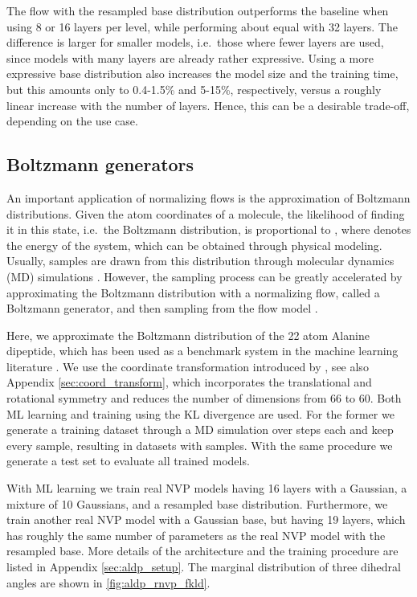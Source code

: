 \documentclass[twoside]{article}
\begin{document}
The flow with the resampled base distribution outperforms the baseline when using 8 or 16 layers per level, while performing about equal with 32 layers. The difference is larger for smaller models, i.e.\ those where fewer layers are used, since models with many layers are already rather expressive. Using a more expressive base distribution also increases the model size and the training time, but this amounts only to 0.4-1.5\% and 5-15\%, respectively, versus a roughly linear increase with the number of layers. Hence, this can be a desirable trade-off, depending on the use case.



\subsection{Boltzmann generators}
\label{sec:boltz_gen}

An important application of normalizing flows is the approximation of Boltzmann distributions. Given the atom coordinates  of a molecule, the likelihood of finding it in this state, i.e.\ the Boltzmann distribution, is proportional to , where  denotes the energy of the system, which can be obtained through physical modeling. Usually, samples are drawn from this distribution through molecular dynamics (MD) simulations \citep{Leimkuhler2015}. However, the sampling process can be greatly accelerated by approximating the Boltzmann distribution with a normalizing flow, called a Boltzmann generator, and then sampling from the flow model \citep{Noe2019}.

Here, we approximate the Boltzmann distribution of the 22 atom Alanine dipeptide, which has been used as a benchmark system in the machine learning literature \citep{Wu2020,Campbell2021,Kohler2021}. We use the coordinate transformation introduced by \cite{Noe2019}, see also Appendix \ref{sec:coord_transform}, which incorporates the translational and rotational symmetry and reduces the number of dimensions from 66 to 60. Both ML learning and training using the KL divergence are used. For the former we generate a training dataset through a MD simulation over  steps each and keep every  sample, resulting in datasets with  samples. With the same procedure we generate a test set to evaluate all trained models.

With ML learning we train real NVP models having 16 layers with a Gaussian, a mixture of 10 Gaussians, and a resampled base distribution. Furthermore, we train another real NVP model with a Gaussian base, but having 19 layers, which has roughly the same number of parameters as the real NVP model with the resampled base. More details of the architecture and the training procedure are listed in Appendix \ref{sec:aldp_setup}. The marginal distribution of three dihedral angles are shown in \autoref{fig:aldp_rnvp_fkld}.
\end{document}
